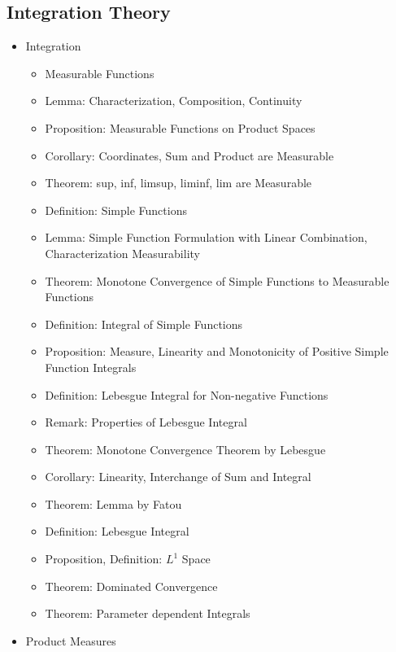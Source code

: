\documentclass[8pt,twocolumn]{article}
\begin{document}
    \subsection{Integration Theory} %
    \label{sub:integration_theory}
      \begin{itemize}
        \item Integration
          \begin{itemize}
            \item Measurable Functions
            \item Lemma: Characterization, Composition, Continuity
            \item Proposition: Measurable Functions on Product Spaces
            \item Corollary: Coordinates, Sum and Product are Measurable
            \item Theorem: sup, inf, limsup, liminf, lim are Measurable
            \item Definition: Simple Functions
            \item Lemma: Simple Function Formulation with Linear Combination, Characterization Measurability
            \item Theorem: Monotone Convergence of Simple Functions to Measurable Functions
            \item Definition: Integral of Simple Functions
            \item Proposition: Measure, Linearity and Monotonicity of Positive Simple Function Integrals
            \item Definition: Lebesgue Integral for Non-negative Functions
            \item Remark: Properties of Lebesgue Integral
            \item Theorem: Monotone Convergence Theorem by Lebesgue
            \item Corollary: Linearity, Interchange of Sum and Integral
            \item Theorem: Lemma by Fatou
            \item Definition: Lebesgue Integral
            \item Proposition, Definition: $L^1$ Space
            \item Theorem: Dominated Convergence
            \item Theorem: Parameter dependent Integrals
          \end{itemize}
        \item Product Measures
          \begin{itemize}

\end{itemize}
\end{itemize}
\end{document}
